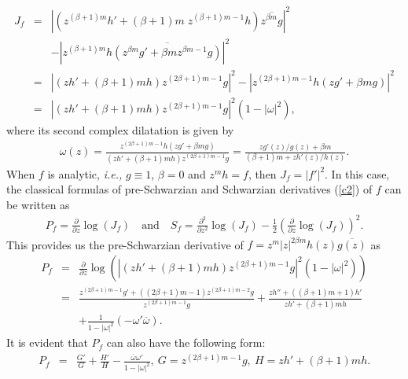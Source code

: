 \documentclass[12pt,reqno]{amsart}
\newtheorem{open problem}{Open problem}[section]
\newcommand{\ol}{\overline}
\newcommand{\beas}{\begin{eqnarray*}}
\newcommand{\eeas}{\end{eqnarray*}}
\newcommand{\bea}{\begin{eqnarray}}
\newcommand{\eea}{\end{eqnarray}}
\numberwithin{equation}{section}
\begin{document}
\beas J_f&=&\left|\left(z^{(\beta+1)m}h'+(\beta+1)m\; z^{(\beta+1)m-1}h\right)\ol{z^{\beta m} g}\right|^2\\[2mm]
&&-\left|z^{(\beta+1)m}h \ol{\left(z^{\beta m}g'+\beta m z^{\beta m-1}g\right)}\right|^2\\[2mm]
&=&\left|(zh'+(\beta+1)m h)z^{(2\beta+1)m-1}g\right|^2-\left|z^{(2\beta+1)m-1}h\left(z g'+\beta m g\right)\right|^2\\[2mm]
&=&\left|(zh'+(\beta+1)m h)z^{(2\beta+1)m-1}g\right|^2\left(1-|\omega|^2\right),\eeas
where its second complex dilatation is given by 
\beas \omega(z)=\frac{z^{(2\beta+1)m-1}h\left(z g'+\beta m g\right)}{(zh'+(\beta+1)m h)z^{(2\beta+1)m-1} g}=\frac{z g'(z)/g(z)+\beta m}{(\beta+1)m+z h'(z)/h(z)}.\eeas
When $f$ is analytic, {\it i.e.,} $g\equiv 1$, $\beta=0$ and $z^m h=f$, then $J_f=|f'|^2$. In this case, the classical formulas of pre-Schwarzian and Schwarzian derivatives (\ref{c2}) of $f$ can be written as
\beas P_f=\frac{\partial}{\partial z}\log(J_f)\quad\text{and}\quad S_f=\frac{\partial^2}{\partial z^2}\log(J_f)-\frac{1}{2}\left(\frac{\partial}{\partial z}\log(J_f)\right)^2.\eeas
 This provides us the pre-Schwarzian derivative of $f=z^m |z|^{2\beta m} h(z)\ol{g(z)}$ as
 \beas P_f&=&\frac{\partial}{\partial z}\log\left(|(zh'+(\beta+1)m h)z^{(2\beta+1)m-1}g|^2\left(1-|\omega|^2\right)\right)\\[2mm]
&=&\frac{z^{(2\beta+1)m-1}g'+((2\beta+1)m-1) z^{(2\beta+1)m-2}g}{z^{(2\beta+1)m-1}g}+\frac{zh''+((\beta+1)m+1) h'}{zh'+(\beta+1)m h}\\[2mm]
&& +\frac{1}{1-|\omega|^2}\left(-\omega'\ol{\omega}\right).\eeas
It is evident that $P_f$ can also have the following form:
 \bea\label{c3} P_f&=&\frac{G'}{G}+\frac{H'}{H}-\frac{\ol{\omega}\omega'}{1-|\omega|^2},~G=z^{(2\beta+1)m-1}g,~ H=zh'+(\beta+1)m h.\eea
\end{document}

